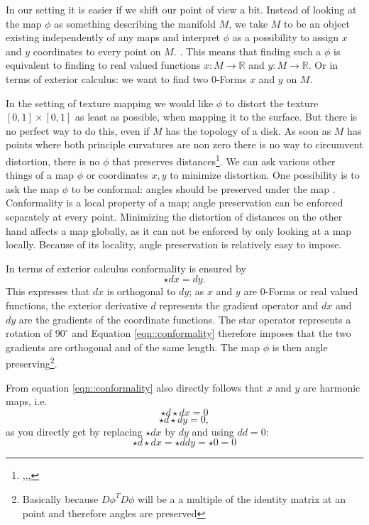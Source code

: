 	In our setting it is easier if we shift our point of view a bit. Instead of looking at the map $\phi$  as something describing the manifold $M$, we take $M$ to be an object existing independently of any maps and interpret $\phi$ as a possibility to assign $x$ and $y$ coordinates to every point on $M$. . This means that finding such a $\phi$ is equivalent to finding to real valued functions $x: M \to \mathbb R$ and $y: M \to \mathbb R$. Or in terms of exterior calculus: we want to find two $0$-Forms $x$ and $y$ on $M$.
	
In the setting of texture mapping we would like $\phi$ to distort the texture $[0,1]\times [0,1]$ as least as possible, when mapping it to the surface. But there is no perfect way to do this, even if $M$ has the topology of a disk. As soon as $M$ has points where both principle curvatures are non zero there is no way to circumvent distortion, there is no $\phi$ that preserves distances\footnote{,,,}. We can ask various other things of a map $\phi$ or coordinates $x,y$ to minimize distortion. One possibility is to ask the map $\phi$ to be conformal: angles should be preserved under the map . Conformality is a local property of a map; angle preservation can be enforced separately at every point. Minimizing the distortion of distances on the other hand affects a map globally, as it can not be enforced by only looking at a map locally. Because of its locality, angle preservation is relatively easy to impose.

In terms of exterior calculus conformality is ensured by
\begin{equation}
 \star dx = dy.
 \label{eqn::conformality}
\end{equation}
This expresses that $dx$ is orthogonal to $dy$; as $x$ and $y$ are $0$-Forms or real valued functions, the exterior derivative $d$ represents the gradient operator and $dx$ and $dy$ are the gradients of the coordinate functions. The star operator represents a rotation of $90^\circ$ and Equation \ref{eqn::conformality} therefore imposes that the two gradients are orthogonal and of the same length. The map $\phi$ is then angle preserving\footnote{Basically because $D\phi^T D\phi$ will be a a multiple of the identity matrix at an point and therefore angles are preserved}.

From equation \ref{eqn::conformality} also directly follows that $x$ and $y$ are harmonic maps, i.e. 
\[\star d \star d x =0\]
\[ \star d \star d y = 0,\] 
as you directly get by replacing $\star d x $ by $dy$ and using $dd = 0$: 
\[\star d \star d x = \star ddy=  \star 0 = 0\]

